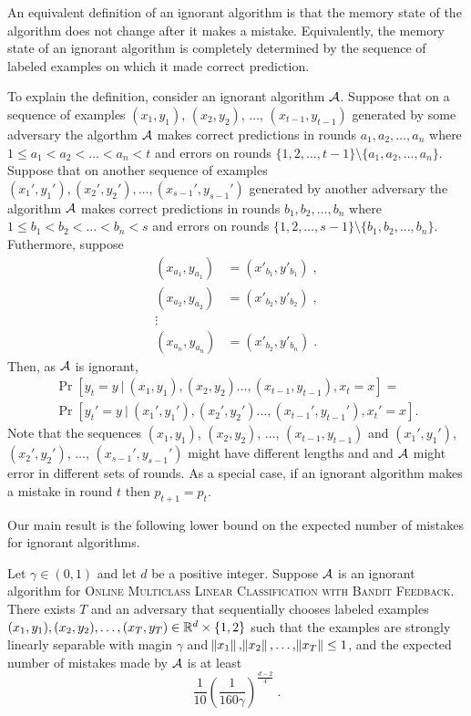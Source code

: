 An equivalent definition of an ignorant algorithm is that the memory state of
the algorithm does not change after it makes a mistake. Equivalently,
the memory state of an ignorant algorithm is completely determined
by the sequence of labeled examples on which it made correct prediction.

To explain the definition, consider an ignorant algorithm $\mathcal{A}$. Suppose that
on a sequence of examples $(x_1, y_1)$, $(x_2, y_2)$, $\dots$, $(x_{t-1}, y_{t-1})$
generated by some adversary the algorthm $\mathcal{A}$ makes correct predictions in
rounds $a_1, a_2, \dots, a_n$ where $1 \le a_1 < a_2 < \dots < a_n < t$ and
errors on rounds $\{1,2,\dots,t-1\} \setminus \{a_1, a_2, \dots, a_n\}$. Suppose
that on another sequence of examples $(x_1', y_1'), (x_2', y_2'), \dots,
(x_{s-1}', y_{s-1}')$ generated by another adversary the algorithm $\mathcal{A}$ makes
correct predictions in rounds $b_1, b_2, \dots, b_n$ where $1 \le b_1 < b_2 <
\dots < b_n < s$ and errors on rounds $\{1,2,\dots,s-1\} \setminus \{b_1, b_2,
\dots, b_n\}$. Futhermore, suppose
\begin{align*}
(x_{a_1}, y_{a_1}) &= (x'_{b_1}, y'_{b_1}) \; , \\
(x_{a_2}, y_{a_2}) &= (x'_{b_2}, y'_{b_2}) \; , \\
\vdots \\
(x_{a_n}, y_{a_n}) &= (x'_{b_2}, y'_{b_n}) \; .
\end{align*}
Then, as $\mathcal{A}$ is ignorant,
\begin{align*}
\Pr[y_t = y ~|~ (x_1, y_1), (x_2, y_2) \dots, (x_{t-1}, y_{t-1}), x_t = x] = \\
\Pr[y_t' = y ~|~ (x_1', y_1'), (x_2', y_2') \dots, (x_{t-1}', y_{t-1}'), x_t' = x].
\end{align*}
Note that the sequences $(x_1, y_1)$, $(x_2, y_2)$, $\dots$, $(x_{t-1},
y_{t-1})$ and $(x_1', y_1')$, $(x_2', y_2')$, $\dots$, $(x_{s-1}', y_{s-1}')$
might have different lengths and and $\mathcal{A}$ might error in different sets of
rounds. As a special case, if an ignorant algorithm makes a mistake in round $t$
then $p_{t+1}=p_t$.

Our main result is the following lower bound on the expected number of mistakes
for ignorant algorithms.

\begin{theorem}
\label{theorem:ignorant-lower-bound}
Let $\gamma \in (0,1)$ and let $d$ be a positive integer. Suppose $\mathcal{A}$ is an
ignorant algorithm for \textsc{Online Multiclass Linear Classification with
Bandit Feedback}. There exists $T$ and an adversary that sequentially chooses
labeled examples $(x_1, y_1), (x_2, y_2), \dots, (x_T, y_T) \in \mathbb{R}^d\times
\{1,2\}$ such that the examples are strongly linearly separable with magin
$\gamma$ and $\norm{x_1}, \norm{x_2}, \dots, \norm{x_T} \le 1$, and the expected
number of mistakes made by $\mathcal{A}$ is at least
$$
\frac{1}{10} \left(\frac{1}{160\gamma}\right)^{\frac{d-2}{4}} \; .
$$
\end{theorem}


